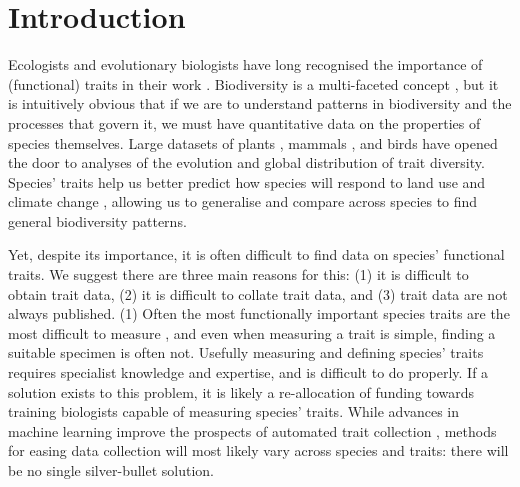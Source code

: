 \documentclass[12pt]{report}
\begin{document}
\clearpage
\section{Introduction}
Ecologists and evolutionary biologists have long recognised the
importance of (functional) traits in their work \autocite{Diaz2001}.
Biodiversity is a multi-faceted concept \autocite{Purvis2000}, but it
is intuitively obvious that if we are to understand patterns in
biodiversity and the processes that govern it, we must have
quantitative data on the properties of species themselves. Large
datasets of plants \autocite{Kattge2011}, mammals
\autocite{Jones2009}, and birds \autocite{Wilman2014} have opened the
door to analyses of the evolution \autocite{Harmon2010a,Pennell2015}
and global distribution \autocite{Kattge2011,Gross2017} of trait
diversity.  Species' traits help us better predict how species will
respond to land use \autocite{Mayfield2010a} and climate change
\autocite{Estrada2016}, allowing us to generalise and compare across
species to find general biodiversity patterns.

Yet, despite its importance, it is often difficult to find data on
species' functional traits. We suggest there are three main reasons
for this: (1) it is difficult to obtain trait data, (2) it is
difficult to collate trait data, and (3) trait data are not always
published. (1) Often the most functionally important species traits
are the most difficult to measure
\autocite{Cornelissen2003,Violle2007}, and even when measuring a trait
is simple, finding a suitable specimen is often not. Usefully
measuring and defining species' traits requires specialist knowledge
and expertise, and is difficult to do properly. If a solution exists
to this problem, it is likely a re-allocation of funding towards
training biologists capable of measuring species' traits. While
advances in machine learning improve the prospects of automated trait
collection \autocite[\emph{e.g.},][]{Pearse2016}, methods for easing
data collection will most likely vary across species and traits: there
will be no single silver-bullet solution.
\end{document}
